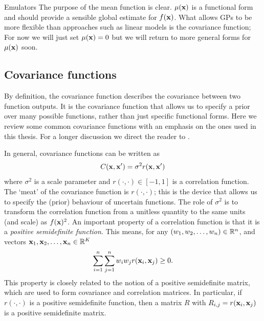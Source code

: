 \begin{chapter}{Emulators \label{Ch:Emulators}}
The purpose of the mean function is clear. $\mu(\mathbf{x})$ is a functional form and should provide a sensible global estimate for $f(\mathbf{x})$. What allows GPs to be more flexible than approaches such as linear models is the covariance function;  For now we will just set $\mu(\mathbf{x}) = 0$ but we will return to more general forms for $\mu(\mathbf{x})$ soon.

\subsection{Covariance functions}
By definition, the covariance function describes the covariance between two function outputs. It is the covariance function that allows us to specify a prior over many possible functions, rather than just specific functional forms. Here we review some common covariance functions with an emphasis on the ones used in this thesis. For a longer discussion we direct the reader to \citet{Rasmussen2006Gpfm}.

In general, covariance functions can be written as
\begin{equation}
  C(\mathbf{x}, \mathbf{x}') = \sigma^2 r(\mathbf{x}, \mathbf{x}')
\end{equation}
where $\sigma^2$ is a scale parameter and $r(\cdot, \cdot) \in [-1,1]$ is a correlation function. The `meat' of the covariance function is $r(\cdot, \cdot)$; this is the device that allows us to specify the (prior) behaviour of uncertain functions. The role of $\sigma^2$ is to transform the correlation function from a unitless quantity to the same units (and scale) as $f(\mathbf{x})^2$. An important property of a correlation function is that it is a \textit{positive semidefinite function}. This means, for any $(w_1, w_2, \ldots, w_n) \in \mathbb{R}^n$, and vectors $\mathbf{x}_1, \mathbf{x}_2, \ldots, \mathbf{x}_n \in \mathbb{R}^K$
\begin{equation}
  \sum_{i = 1}^n \sum_{j = 1}^n w_i w_j r(\mathbf{x}_i, \mathbf{x}_j) \geq 0.
\end{equation}
This property is closely related to the notion of a positive semidefinite matrix, which are used to form covariance and correlation matrices. In particular, if $r(\cdot, \cdot)$ is a positive semidefinite function, then a matrix $R$ with $R_{i,j}  = r(\mathbf{x}_i, \mathbf{x}_j)$ is a positive semidefinite matrix.


\end{chapter}
